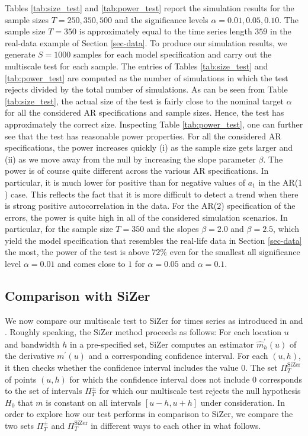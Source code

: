 Tables \ref{tab:size_test} and \ref{tab:power_test} report the simulation results for the sample sizes $T=250,350,500$ and the significance levels $\alpha = 0.01, 0.05, 0.10$. The sample size $T = 350$ is approximately equal to the time series length $359$ in the real-data example of Section \ref{sec-data}. To produce our simulation results, we generate $S=1000$ samples for each model specification and carry out the multiscale test for each sample. The entries of Tables \ref{tab:size_test} and \ref{tab:power_test} are computed as the number of simulations in which the test rejects divided by the total number of simulations. As can be seen from Table \ref{tab:size_test}, the actual size of the test is fairly close to the nominal target $\alpha$ for all the considered AR specifications and sample sizes. Hence, the test has approximately the correct size. Inspecting Table \ref{tab:power_test}, one can further see that the test has reasonable power properties. For all the considered AR specifications, the power increases quickly (i) as the sample size gets larger and (ii) as we move away from the null by increasing the slope parameter $\beta$. The power is of course quite different across the various AR specifications. In particular, it is much lower for positive than for negative values of $a_1$ in the AR($1$) case. This reflects the fact that it is more difficult to detect a trend when there is strong positive autocorrelation in the data. For the AR($2$) specification of the errors, the power is quite high in all of the considered simulation scenarios. In particular, for the sample size $T=350$ and the slopes $\beta = 2.0$ and $\beta = 2.5$, which yield the model specification that resembles the real-life data in Section \ref{sec-data} the most, the power of the test is above $72\%$ even for the smallest all significance level $\alpha = 0.01$ and comes close to $1$ for $\alpha = 0.05$ and $\alpha = 0.1$.


\subsection{Comparison with SiZer}\label{subsec-sim-2}


We now compare our multiscale test to SiZer for times series as introduced in \cite{Rondonotti2004} and \cite{Rondonotti2007}. Roughly speaking, the SiZer method proceeds as follows: For each location $u$ and bandwidth $h$ in a pre-specified set, SiZer computes an estimator $\widehat{m}_h^\prime(u)$ of the derivative $m^\prime(u)$ and a corresponding confidence interval. For each $(u,h)$, it then checks whether the confidence interval includes the value $0$. The set $\Pi_T^{\text{SiZer}}$ of points $(u,h)$ for which the confidence interval does not include $0$ corresponds to the set of intervals $\Pi_T^\pm$ for which our multiscale test rejects the null hypothesis $H_0$ that $m$ is constant on all intervals $[u-h,u+h]$ under consideration. %
In order to explore how our test performs in comparison to SiZer, we compare the two sets $\Pi_T^\pm$ and $\Pi_T^{\text{SiZer}}$ in different ways to each other in what follows. 


